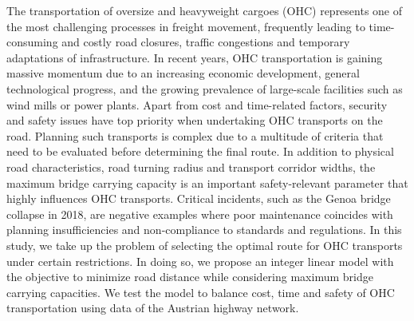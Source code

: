 
The transportation of oversize and heavyweight cargoes (OHC) represents one of the most challenging processes in freight movement, frequently leading to time-consuming and costly road closures, traffic congestions and temporary adaptations of infrastructure. In recent years, OHC transportation is gaining massive momentum due to an increasing economic development, general technological progress, and the growing prevalence of large-scale facilities such as wind mills or power plants. Apart from cost and time-related factors, security and safety issues have top priority when undertaking OHC transports on the road. Planning such transports is complex due to a multitude of criteria that need to be evaluated before determining the final route. In addition to physical road characteristics, road turning radius and transport corridor widths, the maximum bridge carrying capacity is an important safety-relevant parameter that highly influences OHC transports. Critical incidents, such as the Genoa bridge collapse in 2018, are negative examples where poor maintenance coincides with planning insufficiencies and non-compliance to standards and regulations. In this study, we take up the problem of selecting the optimal route for OHC transports under certain restrictions. In doing so, we propose an integer linear model with the objective to minimize road distance while considering maximum bridge carrying capacities. We test the model to balance cost, time and safety of OHC transportation using data of the Austrian highway network.
